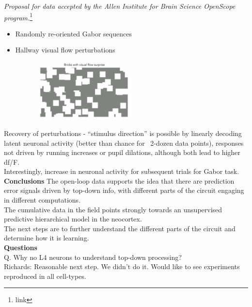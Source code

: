 \documentclass[12pt]{article}
\begin{document}
\textit{Proposal for data accepted by the Allen Institute for Brain Science OpenScope program.}\footnote{link}
 \begin{itemize}
     \item Randomly re-oriented Gabor sequences
     \item Hallway visual flow perturbations
     \begin{figure}
  \centering
      \includegraphics[width=0.5\textwidth]{images/hallway.png}
  \caption{}
\end{figure}
 \end{itemize}
 
Recovery of perturbations - ``stimulus direction'' is possible by linearly decoding latent neuronal activity (better than chance for ~2-dozen data points), responses not driven by running increases or pupil dilations, although both lead to higher df/F. \\

Interestingly, increase in neuronal activity for subsequent trials for Gabor task. \\

\textbf{Conclusions}
The open-loop data supports the idea that there are prediction error signals driven by top-down info, with different parts of the circuit engaging in different computations. \\

The cumulative data in the field points strongly towards an unsupervised predictive hierarchical model in the neocortex. \\

The next steps are to further understand the different parts of the circuit and determine how it is learning. \\

\textbf{Questions} \\

Q. Why no L4 neurons to understand top-down processing? \\

Richards: Reasonable next step. We didn't do it. Would like to see experiments reproduced in all cell-types. \\
\end{document}
